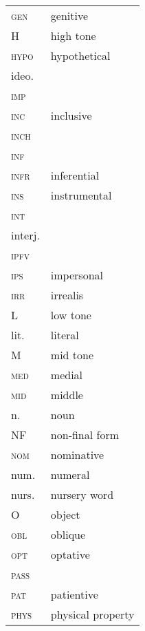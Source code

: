 \begin{tabularx}{.45\textwidth}{lQ} 
\textsc{gen}        &    genitive \\
H					&	 high tone \\
\textsc{hypo}		&	 hypothetical \\
ideo.				&	  \\
\textsc{imp}		&	  \\
\textsc{inc}		&	 inclusive \\
\textsc{inch}		&	  \\
\textsc{inf}		&	  \\
\textsc{infr}		&	 inferential \\
\textsc{ins}        &    instrumental \\
\textsc{int}		&	  \\
interj.				&	  \\
\textsc{ipfv}		&	  \\
\textsc{ips}		&	 impersonal  \\
\textsc{irr}		&	 irrealis \\
L					&	 low tone \\
lit.				&	 literal \\
M					&	 mid tone \\
\textsc{med}		&	 medial \\
\textsc{mid}		&	 middle \\
n.					&	 noun \\
NF					&	 non-final form \\
\textsc{nom}        &    nominative \\
num.				&	 numeral \\
nurs.				&	 nursery word \\
O					&	 object \\
\textsc{obl}        &    oblique \\
\textsc{opt}		&	 optative \\
\textsc{pass}		&	  \\
\textsc{pat}		&	 patientive \\
\textsc{phys}		&	 physical property  \\
\end{tabularx}

